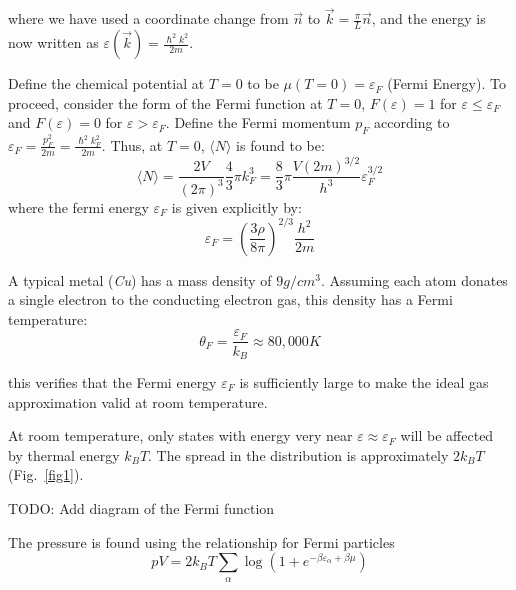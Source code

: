 \documentclass[book.tex]{subfiles}
\begin{document}
\noindent where we have used a coordinate change from $\vec{n}$ to $\vec{k} = \frac{\pi}{L}\vec{n}$, and the energy is now written as $\varepsilon(\vec{k}) = \frac{\hslash^2 k^2}{2m}$.

Define the chemical potential at $T =0$ to be $\mu(T=0)=\varepsilon_F$ (Fermi Energy). To proceed, consider the form of the Fermi function at $T=0$, $F(\varepsilon) = 1$ for $\varepsilon \le \varepsilon_F$ and $F(\varepsilon) = 0$ for $\varepsilon > \varepsilon_F$. Define the Fermi momentum $p_F$ according to $\varepsilon_F = \frac{p^2_F}{2m} = \frac{\hslash^2 k_F^2}{2m}$.
Thus, at $T = 0$, $\langle N \rangle$ is found to be:
\begin{equation} \label{AveN_electrons}
\langle N \rangle = \frac{2V}{(2\pi)^3} \frac{4}{3}\pi k_F^3 = \frac{8}{3}\pi\frac{V(2m)^{3/2}}{h^3}\varepsilon_F^{3/2}
\end{equation}
\noindent where the fermi energy $\varepsilon_F$ is given explicitly by:
\begin{equation} \label{FermiEnergy}
\varepsilon_F = \left(\frac{3\rho}{8\pi}\right)^{2/3} \frac{h^2}{2m}
\end{equation}

A typical metal (\textit{Cu}) has a mass density of $9g/cm^3$. Assuming each atom donates a single electron to the conducting electron gas, this density has a Fermi temperature:
\begin{equation*}
\theta_F = \frac{\varepsilon_F}{k_B} \approx 80,000K
\end{equation*}

\noindent this verifies that the Fermi energy $\varepsilon_F$ is sufficiently large to make the ideal gas approximation valid at room temperature. 

At room temperature, only states with energy very near $\varepsilon \approx \varepsilon_F$ will be affected by thermal energy $k_BT$. The spread in the distribution is approximately $2k_BT$ (Fig.~\ref{fig1}).

TODO: Add diagram of the Fermi function

The pressure is found using the relationship for Fermi particles
\begin{equation}\label{Eq9}
pV = 2k_BT\sum_\alpha \log \left(1 + e^{-\beta \varepsilon_\alpha + \beta \mu} \right)
\end{equation}
\end{document}
